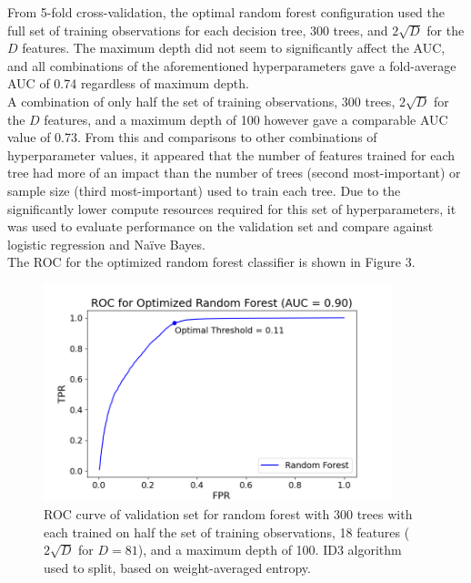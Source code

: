 \documentclass[11pt]{article}
\begin{document}
From 5-fold cross-validation, the optimal random forest configuration used the full set of training observations for each decision tree, 300 trees, and $2\sqrt{D}$ for the $D$ features. The maximum depth did not seem to significantly affect the AUC, and all combinations of the aforementioned hyperparameters gave a fold-average AUC of 0.74 regardless of maximum depth.  \\
 
A combination of only half the set of training observations, 300 trees, $2\sqrt{D}$ for the $D$ features, and a maximum depth of 100 however gave a comparable AUC value of 0.73. From this and comparisons to other combinations of hyperparameter values, it appeared that the number of features trained for each tree had more of an impact than the number of trees (second most-important) or sample size (third most-important) used to train each tree. Due to the significantly lower compute resources required for this set of hyperparameters, it was used to evaluate performance on the validation set and compare against logistic regression and Naïve Bayes. \\

The ROC for the optimized random forest classifier is shown in Figure 3.



\begin{figure}[H]
\centering
\includegraphics[width = 0.9\textwidth]{rf_roc.png} 
\caption{ ROC curve of validation set for random forest with 300 trees with each trained on half the set of training observations, 18 features ($2\sqrt{D}$ for $D = 81$), and a maximum depth of 100. ID3 algorithm used to split, based on weight-averaged entropy. }
\label{ROC}
\end{figure}
\end{document}
